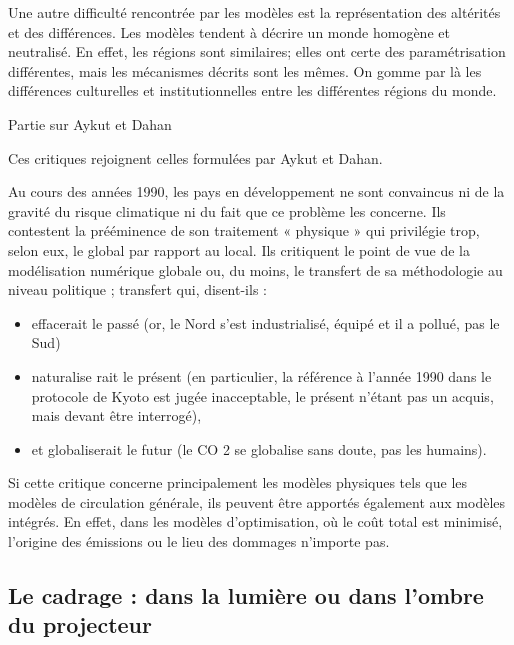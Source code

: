 Une autre difficulté rencontrée par les modèles est la représentation des altérités et des différences. Les modèles tendent à décrire un monde homogène et neutralisé. En effet, les régions sont similaires; elles ont certe des paramétrisation différentes, mais les mécanismes décrits sont les mêmes. On gomme par là les différences culturelles et institutionnelles entre les différentes régions du monde. \\

\begin{tcolorbox}
    Partie sur Aykut et Dahan
\end{tcolorbox}

Ces critiques rejoignent celles formulées par Aykut et Dahan. 

\begin{displayquote}
    Au cours des années 1990, les pays en développement ne sont convaincus ni de la gravité du risque climatique ni du fait que ce problème les concerne. Ils contestent la prééminence de son traitement « physique » qui privilégie trop, selon eux, le global par rapport au local. Ils critiquent le point de vue de la modélisation numérique globale ou, du moins, le transfert de sa méthodologie au niveau politique ; transfert qui, disent-ils :  
    \begin{itemize}
        \item effacerait le passé (or, le Nord s’est industrialisé, équipé et il a pollué, pas le Sud)
	    \item naturalise rait le présent (en particulier, la référence à l’année 1990 dans le protocole de Kyoto est jugée inacceptable, le présent n’étant pas un acquis, mais devant être interrogé),
	   \item et globaliserait le futur (le CO 2 se globalise sans doute, pas les humains).
    \end{itemize}
\end{displayquote}

Si cette critique concerne principalement les modèles physiques tels que les modèles de circulation générale, ils peuvent être apportés également aux modèles intégrés. En effet, dans les modèles d'optimisation, où le coût total est minimisé, l'origine des émissions ou le lieu des dommages n'importe pas. 


\subsection{Le cadrage : dans la lumière ou dans l'ombre du projecteur}

